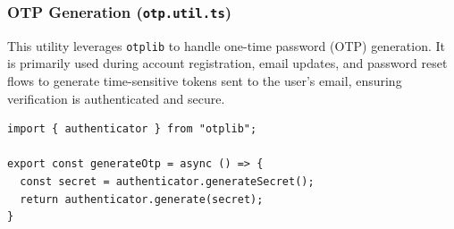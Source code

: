 \subsubsection{OTP Generation (\texttt{otp.util.ts})}
This utility leverages \texttt{otplib} to handle one-time password (OTP) generation. It is primarily used during account registration, email updates, and password reset flows to generate time-sensitive tokens sent to the user's email, ensuring verification is authenticated and secure.

\begin{lstlisting}[caption={OTP Generation Utility}]
import { authenticator } from "otplib";

export const generateOtp = async () => {
  const secret = authenticator.generateSecret();
  return authenticator.generate(secret);
}
\end{lstlisting}